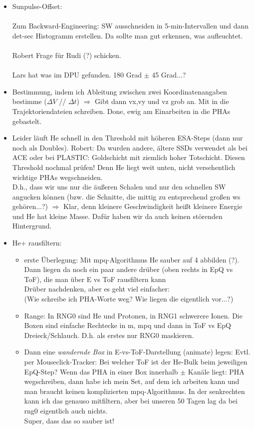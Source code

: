 \documentclass[11pt,letterpaper]{article}
\begin{document}
\begin{itemize}
	\item Sunpulse-Offset: \\ \\Zum Backward-Engineering: SW ausschneiden in 5-min-Intervallen und dann det-sec Histogramm erstellen. Da sollte man gut erkennen, was aufleuchtet.\\ \\ Robert Frage für Rudi (?) schicken.\\ \\
	Lars hat was im DPU gefunden.  180 Grad $\pm$ 45 Grad...?
	\item {} Bestimmung, indem ich Ableitung zwischen zwei Koordinatenangaben bestimme ($\Delta V$ // $\Delta t$) $\Rightarrow$ Gibt dann vx,vy und vz grob an. Mit in die Trajektoriendateien schreiben. Done, ewig am Einarbeiten in die PHAs gebastelt.
	\item Leider läuft He schnell in den Threshold mit höheren ESA-Steps (dann nur noch als Doubles). Robert: Da wurden andere, ältere SSDs verwendet als bei ACE oder bei PLASTIC: Goldschicht mit ziemlich hoher Totschicht.  Diesen Threshold nochmal prüfen! Denn He liegt weit unten, nicht versehentlich wichtige PHAs wegschneiden. \\	 
	D.h., dass wir uns nur die äußeren Schalen und nur den schnellen SW angucken können (bzw. die Schnitte, die mittig zu entsprechend großen ws gehören...?) $\Rightarrow$ Klar, denn kleinere Geschwindigkeit heißt kleinere Energie und He hat kleine Masse.  Dafür haben wir da auch keinen störenden Hintergrund.
	\item He+ rausfiltern:
	\begin{itemize}
		\item erste Überlegung: Mit mpq-Algorithmus He sauber auf 4 abbilden (?). Dann liegen da noch ein paar andere drüber (oben rechts in EpQ vs ToF), die man über E vs ToF rausfiltern kann\\
		Drüber nachdenken, aber es geht viel einfacher:
		\\  (Wie schreibe ich PHA-Worte weg? Wie liegen die eigentlich vor...?)
		\item Range: In RNG0 sind He und Protonen, in RNG1 schwerere Ionen. Die Boxen sind einfache Rechtecke in m, mpq und dann in ToF vs EpQ Dreieck/Schlauch. D.h. als erstes nur RNG0 maskieren.
		\item Dann eine \textit{wandernde Box} in E-vs-ToF-Darstellung (animate) legen: Evtl. per Mouseclick-Tracker: Bei welcher ToF ist der He-Bulk beim jeweiligen EpQ-Step? Wenn das PHA in einer Box innerhalb $\pm$ Kanäle liegt: PHA wegschreiben, dann habe ich mein Set, auf dem ich arbeiten kann und man braucht keinen komplizierten mpq-Algorithmus. In der senkrechten kann ich das genauso mitfiltern, aber bei unseren 50 Tagen lag da bei rng0 eigentlich auch nichts. \\ Super, dass das so sauber ist!

\end{itemize}
\end{itemize}
\end{document}

